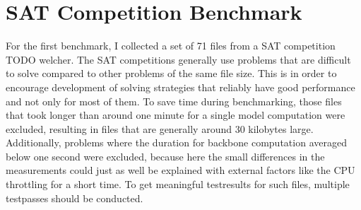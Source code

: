 \section{SAT Competition Benchmark}

For the first benchmark, I collected a set of 71 files from a SAT competition TODO welcher. The SAT competitions generally use problems that are difficult to solve compared to other problems of the same file size. This is in order to encourage development of solving strategies that reliably have good performance and not only for most of them. To save time during benchmarking, those files that took longer than around one minute for a single model computation were excluded, resulting in files that are generally around 30 kilobytes large. Additionally, problems where the duration for backbone computation averaged below one second were excluded, because here the small differences in the measurements could just as well be explained with external factors like the CPU throttling for a short time. To get meaningful testresults for such files, multiple testpasses should be conducted.


